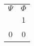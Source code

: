 \documentclass{article}
\begin{document}
\begin{tabular}{c | c}
$\Psi$ & $\Phi$ \\
\hlineWRONG
1 & 1 \\
0 & 0 \\
\end{tabular}
\end{document}
